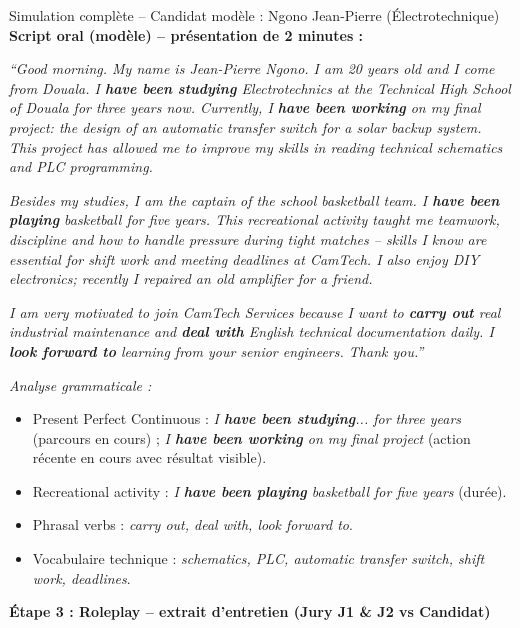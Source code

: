 \documentclass[11pt]{article}
\newcommand{\cle}[1]{{\popxbold\color{popdark}#1}}
\begin{document}
\begin{exoresolu}{Simulation complète -- Candidat modèle : Ngono Jean-Pierre (Électrotechnique)}
\textbf{Script oral (modèle) -- présentation de 2 minutes :}

\emph{``Good morning. My name is Jean-Pierre Ngono. I am 20 years old and I come from Douala. I \textbf{have been studying} Electrotechnics at the Technical High School of Douala for three years now. Currently, I \textbf{have been working} on my final project: the design of an automatic transfer switch for a solar backup system. This project has allowed me to improve my skills in reading technical schematics and PLC programming.}

\emph{Besides my studies, I am the captain of the school basketball team. I \textbf{have been playing} basketball for five years. This recreational activity taught me teamwork, discipline and how to handle pressure during tight matches -- skills I know are essential for shift work and meeting deadlines at CamTech. I also enjoy DIY electronics; recently I repaired an old amplifier for a friend.}

\emph{I am very motivated to join CamTech Services because I want to \textbf{carry out} real industrial maintenance and \textbf{deal with} English technical documentation daily. I \textbf{look forward to} learning from your senior engineers. Thank you.''}

\textit{Analyse grammaticale :}
\begin{itemize}
    \item \cle{Present Perfect Continuous} : \emph{I \textbf{have been studying}... for three years} (parcours en cours) ; \emph{I \textbf{have been working} on my final project} (action récente en cours avec résultat visible).
    \item \cle{Recreational activity} : \emph{I \textbf{have been playing} basketball for five years} (durée).
    \item \cle{Phrasal verbs} : \emph{carry out, deal with, look forward to}.
    \item Vocabulaire technique : \emph{schematics, PLC, automatic transfer switch, shift work, deadlines}.
\end{itemize}

\textbf{Étape 3 : Roleplay -- extrait d'entretien (Jury J1 \& J2 vs Candidat)}


\end{exoresolu}
\end{document}

